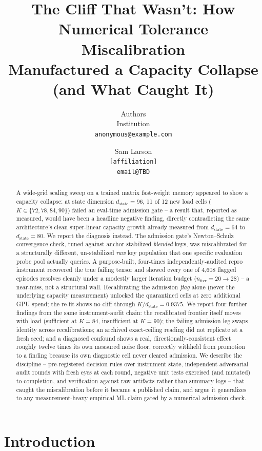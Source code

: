 \documentclass[10pt,letterpaper]{article}
\title{The Cliff That Wasn't: How Numerical Tolerance Miscalibration\\
Manufactured a Capacity Collapse (and What Caught It)}
\author{\anonymous{} Authors\\
  \anonymous{} Institution\\
  \texttt{anonymous@example.com}}
\author{Sam Larson\\
  \texttt{[affiliation]}\\
  \texttt{email@TBD}}
\date{}
\newcommand{\dstate}{d_{\mathrm{state}}}
\newcommand{\niter}{n_{\mathrm{iter}}}
\begin{document}
\maketitle

\begin{abstract}
A wide-grid scaling sweep on a trained matrix fast-weight memory appeared
to show a capacity collapse: at state dimension $\dstate=96$, 11 of 12 new
load cells ($K \in \{72,78,84,90\}$) failed an eval-time admission gate --
a result that, reported as measured, would have been a headline negative
finding, directly contradicting the same architecture's clean super-linear
capacity growth already measured from $\dstate=64$ to $\dstate=80$. We
report the diagnosis instead. The admission gate's Newton--Schulz
convergence check, tuned against anchor-stabilized \emph{blended} keys,
was miscalibrated for a structurally different, un-stabilized \emph{raw}
key population that one specific evaluation probe pool actually queries. A
purpose-built, four-times independently-audited repro instrument recovered
the true failing tensor and showed every one of 4{,}608 flagged episodes
resolves cleanly under a modestly larger iteration budget ($\niter=20 \to
28$) -- a near-miss, not a structural wall. Recalibrating the admission
\emph{flag} alone (never the underlying capacity measurement) unlocked the
quarantined cells at zero additional GPU spend; the re-fit shows no cliff
through $K/\dstate = 0.9375$. We report four further findings from the
same instrument-audit chain: the recalibrated frontier itself moves with
load (sufficient at $K{=}84$, insufficient at $K{=}90$); the failing
admission leg swaps identity across recalibrations; an archived
exact-ceiling reading did not replicate at a fresh seed; and a diagnosed
confound shows a real, directionally-consistent effect roughly
twelve times its own measured noise floor, correctly withheld from
promotion to a finding because its own diagnostic cell never cleared
admission. We describe the discipline -- pre-registered decision rules
over instrument state, independent adversarial audit rounds with fresh
eyes at each round, negative unit tests exercised (and mutated) to
completion, and verification against raw artifacts rather than summary
logs -- that caught the miscalibration before it became a published
claim, and argue it generalizes to any measurement-heavy empirical ML
claim gated by a numerical admission check.
\end{abstract}

\section{Introduction}
\label{sec:intro}
\end{document}
